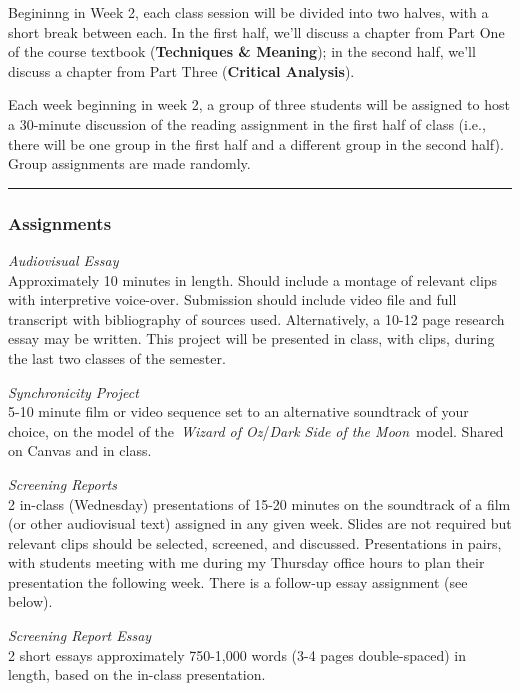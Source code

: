 \documentclass[]{tufte-handout}
\begin{document}
Begininng in Week 2, each class session will be divided into two halves,
with a short break between each. In the first half, we'll discuss a
chapter from Part One of the course textbook (\textbf{Techniques \&
Meaning}); in the second half, we'll discuss a chapter from Part Three
(\textbf{Critical Analysis}).

Each week beginning in week 2, a group of three students will be
assigned to host a 30-minute discussion of the reading assignment in the
first half of class (i.e., there will be one group in the first half and
a different group in the second half). Group assignments are made
randomly.

\begin{center}\rule{0.5\linewidth}{0.5pt}\end{center}

\hypertarget{assignments}{%
\subsubsection{Assignments}\label{assignments}}

\emph{Audiovisual Essay}\\
Approximately 10 minutes in length. Should include a montage of relevant
clips with interpretive voice-over. Submission should include video file
and full transcript with bibliography of sources used. Alternatively, a
10-12 page research essay may be written. This project will be presented
in class, with clips, during the last two classes of the semester.

\emph{Synchronicity Project}\\
5-10 minute film or video sequence set to an alternative soundtrack of
your choice, on the model of the~\emph{Wizard of Oz}/\emph{Dark Side of
the Moon}~model. Shared on Canvas and in class.

\emph{Screening Reports}\\
2 in-class (Wednesday) presentations of 15-20 minutes on the soundtrack
of a film (or other audiovisual text) assigned in any given week. Slides
are not required but relevant clips should be selected, screened, and
discussed. Presentations in pairs, with students meeting with me during
my Thursday office hours to plan their presentation the following week.
There is a follow-up essay assignment (see below).

\emph{Screening Report Essay}\\
2 short essays approximately 750-1,000 words (3-4 pages double-spaced)
in length, based on the in-class presentation.
\end{document}
